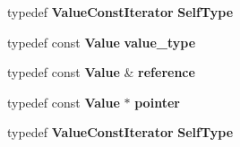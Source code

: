 \begin{DoxyCompactItemize}
\item 
typedef {\bf Value\+Const\+Iterator} {\bfseries Self\+Type}\label{class_json_1_1_value_const_iterator_a0c2e33e7eb5a80dd8709fb28ece83933}

\item 
typedef const {\bf Value} {\bfseries value\+\_\+type}\label{class_json_1_1_value_const_iterator_aa5f1707dcef4bfe73e23ddc14dbe760d}

\item 
typedef const {\bf Value} \& {\bfseries reference}\label{class_json_1_1_value_const_iterator_aa9b05c6a37cd352ea1ee6e13b816f709}

\item 
typedef const {\bf Value} $\ast$ {\bfseries pointer}\label{class_json_1_1_value_const_iterator_a400136bd8bc09e9fddec0785fa2cff14}

\item 
typedef {\bf Value\+Const\+Iterator} {\bfseries Self\+Type}\label{class_json_1_1_value_const_iterator_a0c2e33e7eb5a80dd8709fb28ece83933}

\end{DoxyCompactItemize}
